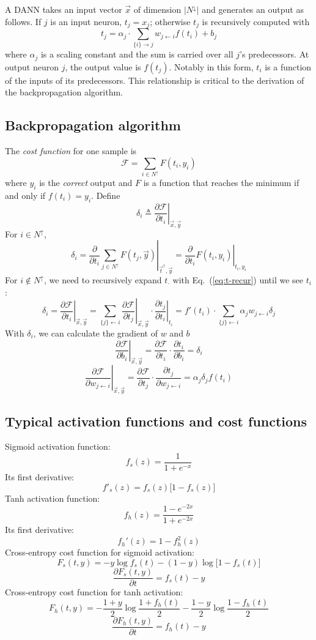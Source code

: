 \documentclass{bioinfo}
\begin{document}
\begin{methods}
A DANN takes an input vector $\vec{x}$ of dimension $|N^{\downarrow}|$ and
generates an output as follows. If $j$ is an input neuron, $t_j=x_j$; otherwise
$t_j$ is recursively computed with
\begin{equation}\label{eq:t-recur}
t_j=\alpha_j\cdot\sum_{\{i\}\to j} w_{j\gets i}f(t_i)+b_j
\end{equation}
where $\alpha_j$ is a scaling constant and the sum is carried over all $j$'s
predecessors. At output neuron $j$, the output value is $f(t_j)$.  Notably in
this form, $t_i$ is a function of the inputs of its predecessors. This
relationship is critical to the derivation of the backpropagation algorithm.

\subsection{Backpropagation algorithm}

The \emph{cost function} for one sample is
\[
\mathcal{F} = \sum_{i\in N^{\uparrow}} F(t_i,y_i)
\]
where $y_i$ is the \emph{correct} output and $F$ is a function that reaches the
minimum if and only if $f(t_i)=y_i$. Define
\[
\delta_i\triangleq\left.\frac{\partial\mathcal{F}}{\partial t_i}\right|_{\vec{x},\vec{y}}
\]
For $i\in N^{\uparrow}$,
\[
\delta_i=\left.\frac{\partial}{\partial t_i}\sum_{j\in N^{\uparrow}} F(t_j,\vec{y})\right|_{\vec{t}^{\uparrow},\vec{y}}=\left.\frac{\partial}{\partial t_i}F(t_i,y_i)\right|_{t_i,y_i}
\]
For $i\not\in N^{\uparrow}$, we need to recursively expand $t_{\cdot}$ with
Eq.~(\ref{eq:t-recur}) until we see $t_i$:
\[
\delta_i=\left.\frac{\partial\mathcal{F}}{\partial t_i}\right|_{\vec{x},\vec{y}}
=\sum_{\{j\}\gets i}\left.\frac{\partial\mathcal{F}}{\partial t_j}\right|_{\vec{x},\vec{y}}\cdot
\left.\frac{\partial t_j}{\partial t_i}\right|_{t_i}
=f'(t_i)\cdot\sum_{\{j\}\gets i}\alpha_jw_{j\gets i}\delta_j
\]
With $\delta_i$, we can calculate the gradient of $w$ and $b$
\[
\left.\frac{\partial \mathcal{F}}{\partial b_i}\right|_{\vec{x},\vec{y}}=\frac{\partial \mathcal{F}}{\partial t_i}\cdot\frac{\partial t_i}{\partial b_i}=\delta_i
\]
\[
\left.\frac{\partial \mathcal{F}}{\partial w_{j\gets i}}\right|_{\vec{x},\vec{y}}=\frac{\partial \mathcal{F}}{\partial t_j}\cdot\frac{\partial t_j}{\partial w_{j\gets i}}
	=\alpha_j\delta_j f(t_i)
\]

\subsection{Typical activation functions and cost functions}

Sigmoid activation function:
\[
f_s(z)=\frac{1}{1+e^{-x}}
\]
Its first derivative:
\[
f'_s(z)=f_s(z)\big[1-f_s(z)\big]
\]
Tanh activation function:
\[
f_h(z)=\frac{1-e^{-2x}}{1+e^{-2x}}
\]
Its first derivative:
\[
f_h'(z)=1-f_h^2(z)
\]
Cross-entropy cost function for sigmoid activation:
\[
F_s(t,y)=-y\log f_s(t)-(1-y)\log\big[1-f_s(t)\big]
\]
\[
\frac{\partial F_s(t,y)}{\partial t}=f_s(t)-y
\]
Cross-entropy cost function for tanh activation:
\[
F_h(t,y)=-\frac{1+y}{2}\log\frac{1+f_h(t)}{2}-\frac{1-y}{2}\log\frac{1-f_h(t)}{2}
\]
\[
\frac{\partial F_h(t,y)}{\partial t}=f_h(t)-y
\]

\end{methods}
\end{document}
